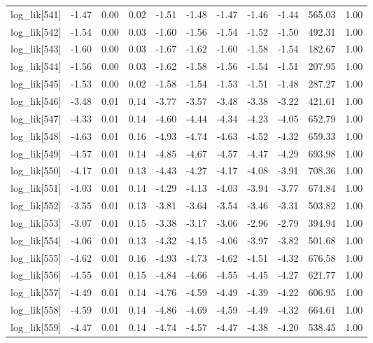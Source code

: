 \begin{table}[ht]
\begin{tabular}{rrrrrrrrrrr}
  log\_lik[541] & -1.47 & 0.00 & 0.02 & -1.51 & -1.48 & -1.47 & -1.46 & -1.44 & 565.03 & 1.00 \\ 
  log\_lik[542] & -1.54 & 0.00 & 0.03 & -1.60 & -1.56 & -1.54 & -1.52 & -1.50 & 492.31 & 1.00 \\ 
  log\_lik[543] & -1.60 & 0.00 & 0.03 & -1.67 & -1.62 & -1.60 & -1.58 & -1.54 & 182.67 & 1.00 \\ 
  log\_lik[544] & -1.56 & 0.00 & 0.03 & -1.62 & -1.58 & -1.56 & -1.54 & -1.51 & 207.95 & 1.00 \\ 
  log\_lik[545] & -1.53 & 0.00 & 0.02 & -1.58 & -1.54 & -1.53 & -1.51 & -1.48 & 287.27 & 1.00 \\ 
  log\_lik[546] & -3.48 & 0.01 & 0.14 & -3.77 & -3.57 & -3.48 & -3.38 & -3.22 & 421.61 & 1.00 \\ 
  log\_lik[547] & -4.33 & 0.01 & 0.14 & -4.60 & -4.44 & -4.34 & -4.23 & -4.05 & 652.79 & 1.00 \\ 
  log\_lik[548] & -4.63 & 0.01 & 0.16 & -4.93 & -4.74 & -4.63 & -4.52 & -4.32 & 659.33 & 1.00 \\ 
  log\_lik[549] & -4.57 & 0.01 & 0.14 & -4.85 & -4.67 & -4.57 & -4.47 & -4.29 & 693.98 & 1.00 \\ 
  log\_lik[550] & -4.17 & 0.01 & 0.13 & -4.43 & -4.27 & -4.17 & -4.08 & -3.91 & 708.36 & 1.00 \\ 
  log\_lik[551] & -4.03 & 0.01 & 0.14 & -4.29 & -4.13 & -4.03 & -3.94 & -3.77 & 674.84 & 1.00 \\ 
  log\_lik[552] & -3.55 & 0.01 & 0.13 & -3.81 & -3.64 & -3.54 & -3.46 & -3.31 & 503.82 & 1.00 \\ 
  log\_lik[553] & -3.07 & 0.01 & 0.15 & -3.38 & -3.17 & -3.06 & -2.96 & -2.79 & 394.94 & 1.00 \\ 
  log\_lik[554] & -4.06 & 0.01 & 0.13 & -4.32 & -4.15 & -4.06 & -3.97 & -3.82 & 501.68 & 1.00 \\ 
  log\_lik[555] & -4.62 & 0.01 & 0.16 & -4.93 & -4.73 & -4.62 & -4.51 & -4.32 & 676.58 & 1.00 \\ 
  log\_lik[556] & -4.55 & 0.01 & 0.15 & -4.84 & -4.66 & -4.55 & -4.45 & -4.27 & 621.77 & 1.00 \\ 
  log\_lik[557] & -4.49 & 0.01 & 0.14 & -4.76 & -4.59 & -4.49 & -4.39 & -4.22 & 606.95 & 1.00 \\ 
  log\_lik[558] & -4.59 & 0.01 & 0.14 & -4.86 & -4.69 & -4.59 & -4.49 & -4.32 & 664.61 & 1.00 \\ 
  log\_lik[559] & -4.47 & 0.01 & 0.14 & -4.74 & -4.57 & -4.47 & -4.38 & -4.20 & 538.45 & 1.00 \\ 

\end{tabular}
\end{table}

